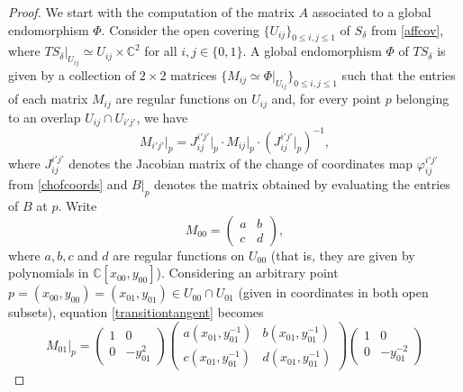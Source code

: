 \documentclass{amsart} %
\theoremstyle{definition}
\begin{document}
\begin{proof}
We start with the computation of the matrix $ A $ associated to a global endomorphism $ \Phi $.
Consider the open covering
$\{U_{ij}\}_{0\leq i,j\leq 1}$ of $S_{\delta}$ from \eqref{affcov}, where
$ TS_{\delta} \vert_{U_{ij}} \simeq U_{ij} \times \mathbb{C}^{2} $ for all $i,j\in \{0,1\}$.
A global endomorphism $ \Phi $ of $ TS_{\delta} $ is given by a collection of $2\times 2$ matrices
$\{M_{ij}\simeq \Phi \vert_{U_{ij}} \}_{0\leq i,j\leq 1}$ such that
the entries of each matrix $M_{ij}$ are regular functions on $U_{ij}$ and, for every point $p$
belonging to an overlap $U_{ij}\cap U_{i'j'}$, we have
 \begin{equation}\label{transitiontangent}
   M_{i'j'}\!\vert_{p}=J_{ij}^{i'j'}\!\vert_{p}\cdot M_{ij}\!\vert_{p}\cdot (J_{ij}^{i'j'}\!\vert_{p})^{-1},
 \end{equation}
where $J_{ij}^{i'j'}$ denotes the Jacobian matrix of the change of coordinates map
$\varphi_{ij}^{i'j'}$  from \eqref{chofcoords} and
 $ B\vert_p $ denotes the matrix obtained by evaluating the entries of $ B $ at $ p $. Write
\begin{equation}\label{MU}
  M_{00} = \begin{pmatrix}
          a & b \\
          c & d
        \end{pmatrix},
\end{equation}
where  $a,b,c$ and $d$ are regular functions on $U_{00}$ (that is, they are given by polynomials in
$\mathbb{C}[x_{00},y_{00}]$). Considering an arbitrary point
$p=(x_{00},y_{00})=(x_{01},y_{01})\in U_{00}\cap U_{01}$
(given in coordinates in both open subsets), equation \eqref{transitiontangent} becomes
\begin{equation}\label{01}
M_{01}\vert_p = \begin{pmatrix}
             1 & 0 \\
             0 & -y_{01}^2
           \end{pmatrix}
        \begin{pmatrix}
          a(x_{01},y_{01}^{-1}) & b(x_{01},y_{01}^{-1}) \\
          c(x_{01},y_{01}^{-1}) & d(x_{01},y_{01}^{-1})
        \end{pmatrix}
        \begin{pmatrix}
             1 & 0 \\
             0 & -y_{01}^{-2}

\end{pmatrix}
\end{equation}
\end{proof}
\end{document}
